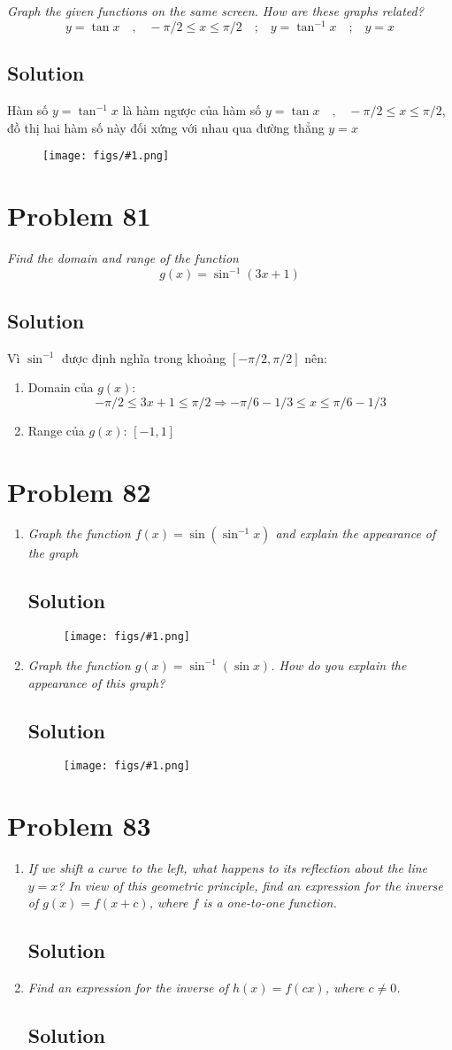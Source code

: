 \documentclass[11pt]{article}
\newcommand{\soln}{\subsection*}
\newcommand{\qn}{\textit}
\newcommand{\imgsoln}[1]{
	\begin{figure}[H]
		\centering
		\texttt{[image: figs/\#1.png]}
	\end{figure}
}
\newcommand{\eqtext}[1]{\quad\text{#1}\quad}
\begin{document}
\qn{Graph the given functions on the same screen. How are these graphs related? $$y=\tan{x} \eqtext{,} -\pi/2 \le x \le \pi/2 \eqtext{;} y=\tan^{-1}x \eqtext{;} y=x$$}
\soln{Solution}
Hàm số $y=\tan^{-1}x$ là hàm ngược của hàm số $y=\tan{x} \eqtext{,} -\pi/2 \le x \le \pi/2$, đồ thị hai hàm số này đối xứng với nhau qua đường thẳng $y=x$
\imgsoln{1.5.80-ans}

\section*{Problem 81}

\qn{Find the domain and range of the function $$g(x)=\sin^{-1}(3x+1)$$}

\soln{Solution}
Vì $\sin^{-1}$ được định nghĩa trong khoảng $[-\pi/2, \pi/2]$ nên:
\begin{enumerate}
	\item Domain của $g(x)$: $$-\pi/2 \le 3x+1 \le \pi/2 \Rightarrow -\pi/6-1/3 \le x \le \pi/6 -1/3$$
	\item Range của $g(x)$: $[-1, 1]$
\end{enumerate}

\section*{Problem 82}

\begin{enumerate}
	\item \qn{Graph the function $f(x)=\sin(\sin^{-1}x)$ and explain the appearance of the graph}
	\soln{Solution}
	\imgsoln{1.5.82-ans.a}
	
	\item \qn{Graph the function $g(x)=\sin^{-1}(\sin{x})$. How do you explain the appearance of this graph?}
	\soln{Solution}
	\imgsoln{1.5.82-ans.b}
\end{enumerate}

\section*{Problem 83}

\begin{enumerate}
	\item \qn{If we shift a curve to the left, what happens to its reflection about the line $y=x$? In view of this geometric principle, find an expression for the inverse of $g(x)=f(x+c)$, where $f$ is a one-to-one function.}
	\soln{Solution}
	
	\item \qn{Find an expression for the inverse of $h(x)=f(cx)$, where $c \ne 0$.}
	\soln{Solution}
\end{enumerate}
\end{document}
